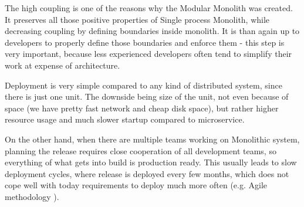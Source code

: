 The high coupling is one of the reasons why the Modular Monolith was created. It preserves all those positive properties of Single process Monolith, while decreasing coupling by defining boundaries inside monolith. It is than again up to developers to properly define those boundaries and enforce them - this step is very important, because less experienced developers often tend to simplify their work at expense of architecture.

Deployment is very simple compared to any kind of distributed system, since there is just one unit. The downside being size of the unit, not even because of space (we have pretty fast network and cheap disk space), but rather higher resource usage and much slower startup compared to microservice.

On the other hand, when there are multiple teams working on Monolithic system, planning the release requires close cooperation of all development teams, so everything of what gets into build is production ready. This usually leads to slow deployment cycles, where release is deployed every few months, which does not cope well with today requirements to deploy much more often (e.g. Agile methodology \cite{AGILE_MANIFESTO}).

